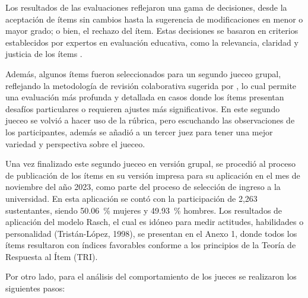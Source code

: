 Los resultados de las evaluaciones reflejaron una gama de decisiones,
desde la aceptación de ítems sin cambios hasta la sugerencia de
modificaciones en menor o mayor grado; o bien, el rechazo del ítem.
Estas decisiones se basaron en criterios establecidos por expertos en
evaluación educativa, como la relevancia, claridad y justicia de los
ítems \cite{Downing2003}.

Además, algunos ítems fueron seleccionados para un segundo jueceo
grupal, reflejando la metodología de revisión colaborativa sugerida por
\textcite{Stiggins2001}, lo cual permite una evaluación más profunda y detallada
en casos donde los ítems presentan desafíos particulares o requieren
ajustes más significativos. En este segundo jueceo se volvió a hacer uso
de la rúbrica, pero escuchando las observaciones de los participantes,
además se añadió a un tercer juez para tener una mejor variedad y
perspectiva sobre el jueceo.

Una vez finalizado este segundo jueceo en versión grupal, se procedió al
proceso de publicación de los ítems en su versión impresa para su
aplicación en el mes de noviembre del año 2023, como parte del proceso
de selección de ingreso a la universidad. En esta aplicación se contó
con la participación de 2,263 sustentantes, siendo 50.06~\% mujeres y
49.93~\% hombres. Los resultados de aplicación del modelo Rasch, el cual
es idóneo para medir actitudes, habilidades o personalidad
(Tristán-López, 1998), se presentan en el Anexo 1, donde todos los ítems
resultaron con índices favorables conforme a los principios de la Teoría
de Respuesta al Ítem (TRI).

Por otro lado, para el análisis del comportamiento de los jueces se
realizaron los siguientes pasos:

